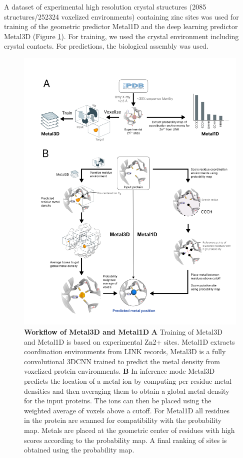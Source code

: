\documentclass[  ASAPversion,
  ,
  9pt]{elife}
\begin{document}
A dataset of experimental high resolution crystal structures (2085 structures/252324 voxelized environments) containing zinc sites was used for training of the geometric predictor Metal1D and the deep learning predictor Metal3D (Figure \ref{fig:method}). For training, we used the crystal environment including crystal contacts. For predictions, the biological assembly was used.

\begin{figure}
\hypertarget{fig:method}{%
\centering
\includegraphics{images/Metal3D_Metal1D_method.png}
\caption{\textbf{Workflow of Metal3D and Metal1D} \textbf{A} Training of Metal3D and Metal1D is based on experimental Zn2+ sites. Metal1D extracts coordination environments from LINK records, Metal3D is a fully convolutional 3DCNN trained to predict the metal density from voxelized protein environments. \textbf{B} In inference mode Metal3D predicts the location of a metal ion by computing per residue metal densities and then averaging them to obtain a global metal density for the input proteins. The ions can then be placed using the weighted average of voxels above a cutoff. For Metal1D all residues in the protein are scanned for compatibility with the probability map. Metals are placed at the geometric center of residues with high scores according to the probability map. A final ranking of sites is obtained using the probability map.}\label{fig:method}
}
\end{figure}
\end{document}

